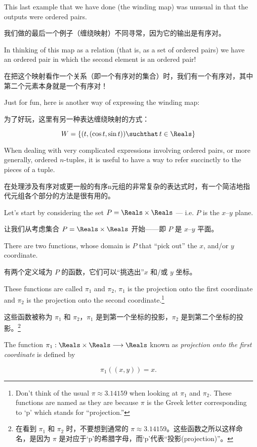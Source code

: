 This last example that we have done (the winding map) was unusual in that
the outputs were ordered pairs.

我们做的最后一个例子（缠绕映射）不同寻常，因为它的输出是有序对。

In thinking of this map as a relation
(that is, as a set of ordered pairs) we have an ordered pair in which 
the second element is an ordered pair!

在把这个映射看作一个关系（即一个有序对的集合）时，我们有一个有序对，其中第二个元素本身就是一个有序对！

Just for fun, here is another 
way of expressing the winding map:

为了好玩，这里有另一种表达缠绕映射的方式：

\[ W = \{ (t, (\cos{t}, \sin{t})) \suchthat \, t \in \Reals \} \]

When dealing with very complicated expressions involving ordered
pairs, or more generally, ordered $n$-tuples, it is useful to 
have a way to refer succinctly to the pieces of a tuple.

在处理涉及有序对或更一般的有序n元组的非常复杂的表达式时，有一个简洁地指代元组各个部分的方法是很有用的。

Let's start by considering the set $P = \Reals \times \Reals$ --- i.e. 
$P$ is the $x$--$y$ plane.

让我们从考虑集合 $P = \Reals \times \Reals$ 开始——即 $P$ 是 $x$--$y$ 平面。

There are two functions, whose domain is $P$
that ``pick out'' the $x$, and/or $y$ coordinate.

有两个定义域为 $P$ 的函数，它们可以“挑选出”$x$ 和/或 $y$ 坐标。

These functions are
called $\pi_1$ and $\pi_2$, $\pi_1$ is the projection onto the first
coordinate and $\pi_2$ is the projection onto the second coordinate.\footnote{%
Don't think of the usual $\pi \approx 3.14159$ when looking at $\pi_1$ and %
$\pi_2$. These functions are named as they are because $\pi$ is the Greek %
letter corresponding to `p' which stands for ``projection.''}

这些函数被称为 $\pi_1$ 和 $\pi_2$，$\pi_1$ 是到第一个坐标的投影，$\pi_2$ 是到第二个坐标的投影。\footnote{在看到 $\pi_1$ 和 $\pi_2$ 时，不要想到通常的 $\pi \approx 3.14159$。这些函数之所以这样命名，是因为 $\pi$ 是对应于‘p’的希腊字母，而‘p’代表“投影(projection)”。}

\begin{defi}
The function $\pi_1: \Reals \times \Reals \longrightarrow \Reals$ known
as \emph{projection onto the first coordinate} is
defined by

\[ \pi_1((x,y)) = x. \]
 
\end{defi}

